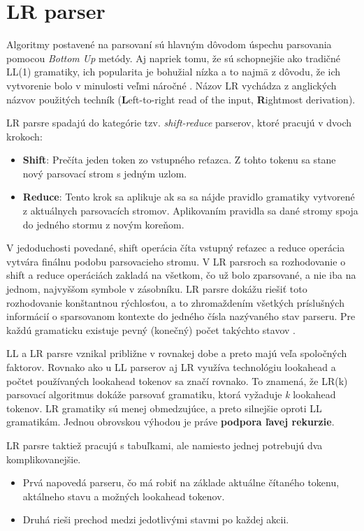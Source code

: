 \section{LR parser}\label{LR}
Algoritmy postavené na  parsovaní sú hlavným dôvodom úspechu parsovania pomocou \textit{Bottom Up} metódy. Aj napriek tomu, že sú schopnejšie ako tradičné LL(1) gramatiky, ich popularita je bohužial nízka a to najmä z dôvodu, že ich vytvorenie bolo v minulosti veľmi náročné \cite{tomassetti:parsing}. Názov LR vychádza z anglických názvov použitých techník (\textbf{L}eft-to-right read of the input, \textbf{R}ightmost derivation).

LR parsre spadajú do kategórie tzv. \textit{shift-reduce} parserov, ktoré pracujú v dvoch krokoch:
\begin{itemize}
\item \textbf{Shift}: Prečíta jeden token zo vstupného reťazca. Z tohto tokenu sa stane nový parsovací strom s jedným uzlom.
\item \textbf{Reduce}: Tento krok sa aplikuje ak sa sa nájde pravidlo gramatiky vytvorené z aktuálnych parsovacích stromov. Aplikovaním pravidla sa dané stromy spoja do jedného stormu z novým koreňom.
\end{itemize}

V jedoduchosti povedané, shift operácia číta vstupný reťazec a reduce operácia vytvára finálnu podobu parsovacieho stromu. V LR parsroch sa rozhodovanie o shift a reduce operáciách zakladá na všetkom, čo už bolo zparsované, a nie iba na jednom, najvyššom symbole v zásobníku. LR parsre dokážu riešiť toto rozhodovanie konštantnou rýchlosťou, a to zhromaždením všetkých príslušných informácií o sparsovanom kontexte do jedného čísla nazývaného stav parseru. Pre každú gramaticku existuje pevný (konečný) počet takýchto stavov \cite{LR}.

LL a LR parsre vznikal približne v rovnakej dobe a preto majú veľa spoločných faktorov. Rovnako ako u LL parserov aj LR využíva technológiu lookahead a počtet používaných lookahead tokenov sa značí rovnako. To znamená, že LR(k) parsovací algoritmus dokáže parsovať gramatiku, ktorá vyžaduje \textit{k} lookahead tokenov. LR gramatiky sú menej obmedzujúce, a preto silnejšie oproti LL gramatikám. Jednou obrovskou výhodou je práve \textbf{podpora ľavej rekurzie}.

LR parsre taktiež pracujú s tabuľkami, ale namiesto jednej potrebujú dva komplikovanejšie. 
\begin{itemize}
\item Prvá napovedá parseru, čo má robiť na základe aktuálne čítaného tokenu, aktálneho stavu a možných lookahead tokenov.
\item Druhá rieši prechod medzi jedotlivými stavmi po každej akcii.
\end{itemize}


